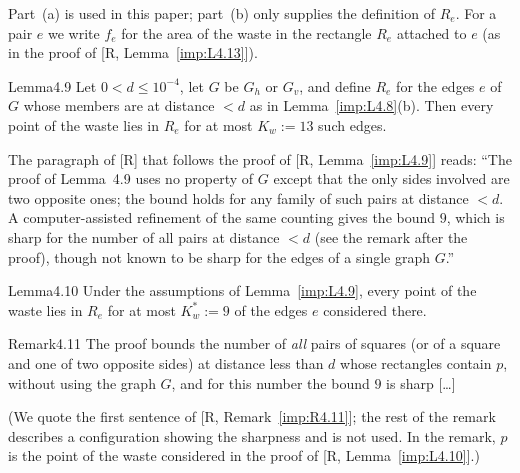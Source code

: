 \documentclass[11pt]{amsart}
\theoremstyle{definition}
\theoremstyle{remark}
\numberwithin{equation}{section}
\begin{document}
Part~(a) is used in this paper; part~(b) only supplies the definition of $R_e$. For a pair $e$ we write $f_e$ for the
area of the waste in the rectangle $R_e$ attached to $e$ (as in the proof of [R, Lemma~\ref{imp:L4.13}]).

\begin{ImpStatement}{Lemma}{4.9}\label{imp:L4.9}
Let $0<d\le10^{-4}$, let $G$ be $G_h$ or $G_v$, and define $R_e$ for the edges $e$ of $G$ whose members are at distance $<d$ as
in Lemma~\ref{imp:L4.8}(b). Then every point of the waste lies in $R_e$ for at most $K_w:=13$ such edges.
\end{ImpStatement}

The paragraph of [R] that follows the proof of [R, Lemma~\ref{imp:L4.9}] reads:
``The proof of Lemma~4.9 uses no property of $G$ except that the only sides involved are two opposite ones; the bound
holds for any family of such pairs at distance $<d$. A computer-assisted refinement of the same counting gives the bound $9$, which
is sharp for the number of all pairs at distance $<d$ (see the remark after the proof), though not known to be sharp for the edges
of a single graph $G$.''

\begin{ImpStatement}{Lemma}{4.10}\label{imp:L4.10}
Under the assumptions of Lemma~\ref{imp:L4.9}, every point of the waste lies in $R_e$ for at most $K_w^*:=9$ of the edges $e$
considered there.
\end{ImpStatement}

\begin{ImpStatement}{Remark}{4.11}\label{imp:R4.11}
The proof bounds the number of \emph{all} pairs of squares (or of a square and one of two opposite sides) at distance less than $d$ whose
rectangles contain $p$, without using the graph $G$, and for this number the bound $9$ is sharp [\dots]
\end{ImpStatement}

(We quote the first sentence of [R, Remark~\ref{imp:R4.11}]; the rest of the remark describes a configuration
showing the sharpness and is not used. In the remark, $p$ is the point of the waste considered in the proof of
[R, Lemma~\ref{imp:L4.10}].)
\end{document}
